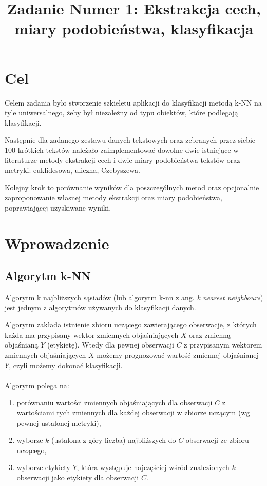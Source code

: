 \documentclass{classrep}
\author{
  \studentinfo{Michał Janiszewski}{169485} \and
  \studentinfo{Mariusz Łucka}{169493}
}
\title{Zadanie Numer 1: Ekstrakcja cech, miary podobieństwa, klasyfikacja}
\begin{document}
\maketitle

\section{Cel}
Celem zadania było stworzenie szkieletu aplikacji do klasyfikacji metodą k-NN na tyle uniwersalnego, żeby był niezależny od typu obiektów, które podlegają klasyfikacji.

Następnie dla zadanego zestawu danych tekstowych oraz zebranych przez siebie 100 krótkich tekstów należało zaimplementować dowolne dwie istniejące w literaturze metody ekstrakcji cech i dwie miary podobieństwa tekstów oraz metryki: euklidesowa, uliczna, Czebyszewa.

Kolejny krok to porównanie wyników dla poszczególnych metod oraz opcjonalnie zaproponowanie własnej metody ekstrakcji oraz miary podobieństwa, poprawiającej uzyskiwane wyniki. 

\section{Wprowadzenie}
\subsection{Algorytm k-NN}
Algorytm k najbliższych sąsiadów (lub algorytm k-nn z ang. \textit{k nearest neighbours}) jest jednym z algorytmów używanych do klasyfikacji danych. 

Algorytm zakłada istnienie zbioru uczącego zawierającego obserwacje, z których każda ma przypisany wektor zmiennych objaśniających $X$ oraz zmienną objaśnianą $Y$ (etykietę). Wtedy dla pewnej obserwacji $C$ z przypisanym wektorem zmiennych objaśniających $X$ możemy prognozować wartość zmiennej objaśnianej $Y$, czyli możemy dokonać klasyfikacji.

\paragraph{}
Algorytm polega na:

\begin{enumerate}
\item porównaniu wartości zmiennych objaśniających dla obserwacji $C$ z wartościami tych zmiennych dla każdej obserwacji w zbiorze uczącym (wg pewnej ustalonej metryki),
\item wyborze $k$ (ustalona z góry liczba) najbliższych do $C$ obserwacji ze zbioru uczącego,
\item wyborze etykiety $Y$, która występuje najczęściej wśród znalezionych $k$ obserwacji jako etykiety dla obserwacji $C$. 
\end{enumerate}
\end{document}

